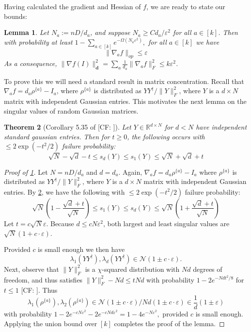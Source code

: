 \documentclass{article}
\newtheorem{theorem}{Theorem}
\newtheorem{lemma}[theorem]{Lemma}
\newcommand{\R}{{\mathbb{R}}}
\renewcommand{\vec}{\bm}
\newcommand\eps{\varepsilon}
\newcommand\cN{\mathcal{N}}
\newcommand{\CF}[1]{{\color{purple}[CF: #1]}}
\begin{document}
Having calculated the gradient and Hessian of $f$, we are ready to state our bounds:

\begin{lemma}\label{lemma:gradient-bound} Let $N_a := n D/d_a$, and suppose $N_a \geq C d_a/\eps^2$ for all $a \in [k]$. Then with probability at least $1 -  \sum_{a \in [k]} e^{-\Omega(N_a \eps^2)},$ for all $a \in [k]$ we have
$$\| \nabla_a f \|_{op} \leq \eps$$
As a consequence, $\|\nabla f(I)\|_{\vec d} ^{2} = \sum_{a}\frac{1}{d_a} \|\nabla_a f \|_{F}^{2} \leq k \eps^{2}$.
\end{lemma}

To prove this we will need a standard result in matrix concentration. Recall that $\nabla_a f = d_a \rho^{\{a\}} - I_a$, where $\rho^{\{a\}}$ is distributed as $Y Y^\dagger/\|Y\|_F^2$, where $Y$ is a $d \times N$ matrix with independent Gaussian entries. This motivates the next lemma on the singular values of random Gaussian matrices.

\begin{theorem} [Corollary 5.35 of \CF{\cite{vershinyn}}]\label{cor:vershynin}
Let $Y \in \R^{d \times N}$ for $d < N$ have independent standard gaussian entries. Then for $t \geq 0$, the following occurs with $\leq 2 \exp(-t^{2}/2)$ failure probability:
\[ \sqrt{N} - \sqrt{d} - t \leq s_{d}(Y) \leq s_{1}(Y) \leq \sqrt{N} + \sqrt{d} + t  \]
\end{theorem}




\begin{proof}[Proof of \cref{lemma:gradient-bound}]Let $N = n D/d_a$ and $d = d_a$. Again, $\nabla_a f = d_a \rho^{\{a\}} - I_a$ where $\rho^{\{a\}}$ is distributed as $Y Y^\dagger/\|Y\|_F^2$, where $Y$ is a $d \times N$ matrix with independent Gaussian entries.
By \cref{cor:vershynin}, we have the following with $\leq 2 \exp(-t^{2}/2)$ failure probability:
\[\sqrt{N} \left( 1 -  \frac{\sqrt{d} + t }{\sqrt{N}}  \right)\leq  s_{1} \left( Y \right) \leq s_{d}\left( Y \right) \leq  \sqrt{N} \left( 1 + \frac{\sqrt{d} + t }{\sqrt{N}}  \right)  \]
Let $t = c \sqrt{N} \eps$. Because $d \leq c N \eps^2$, both largest and least singular values are
$\sqrt{N} \left( 1 + c \cdot \eps   \right)$.

Provided $c$ is small enough we then have
 $$\lambda_1(YY^\dagger), \lambda_{d}(YY^\dagger) \in \cN(1 \pm c \cdot \eps).$$
 Next, observe that $\|Y\|_F^2$ is a $\chi$-squared distribution with $Nd$ degrees of freedom, and thus satisfies $\| Y\|_F^2 - Nd \leq t N d$ with probability $1 - 2e^{- Nd t^2/8}$ for $t \leq 1$ \CF{\cite{wainwright}}. Thus
  $$\lambda_1(\rho^{\{a\}}), \lambda_2(\rho^{\{a\}}) \in  \cN(1 \pm c \cdot \eps)/ Nd(1 \pm c \cdot \eps) \in \frac{1}{d}(1 \pm \eps)$$
with probability $1 - 2 e^{- c N \eps^2}- 2 e^{- c Nd \eps^2} = 1 - 4 e^{- N\eps^2},$ provided $c$ is small enough. Applying the union bound over $[k]$ completes the proof of the lemma.\end{proof}
\end{document}
